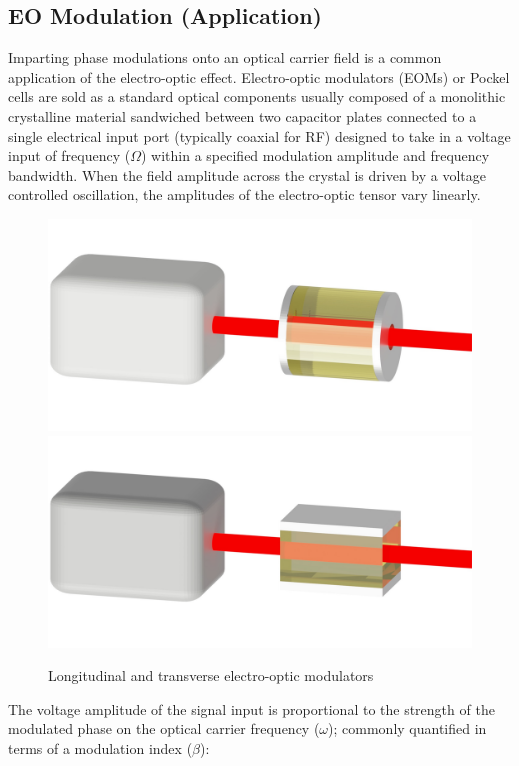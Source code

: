 
\subsection{EO Modulation (Application)}\label{sec:EOM}
Imparting phase modulations onto an optical carrier field is a common application of the electro-optic effect. Electro-optic modulators (EOMs) or Pockel cells are sold as a standard optical components usually composed of a monolithic crystalline material sandwiched between two capacitor plates connected to a single electrical input port (typically coaxial for RF) designed to take in a voltage input of frequency ($\Omega$) within a specified modulation amplitude and frequency bandwidth. When the field amplitude across the crystal is driven by a voltage controlled oscillation, the amplitudes of the electro-optic tensor vary linearly. 

\begin{figure}[H]
    \centering
    \includegraphics[width=.5\textwidth]{figs/ALGAAS/eom_l_assembly.pdf}
    \\
    \vspace{-9mm}
    \includegraphics[width=.5\textwidth]{figs/ALGAAS/eom_t_assembly.pdf}
\caption{Longitudinal and transverse electro-optic modulators}
\label{fig:EOM_types}
\end{figure}

The voltage amplitude of the signal input is proportional to the strength of the modulated phase on the optical carrier frequency ($\omega$); commonly quantified in terms of a modulation index ($\beta$):


